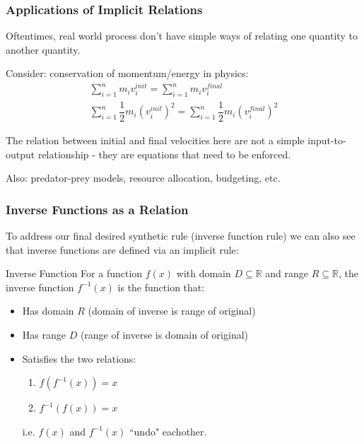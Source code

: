 \documentclass{ltx-talk}
\begin{document}
\begin{frame}
  \frametitle{Applications of Implicit Relations}

  Oftentimes, real world process don't have simple ways of relating one quantity to another quantity. \pause

  Consider: conservation of momentum/energy in physics:
  \begin{gather}
    \sum\limits_{i = 1}^n m_i v^{init}_i = \sum\limits_{i = 1}^n m_i v^{final}_i \\
    \sum\limits_{i = 1}^n \dfrac{1}{2} m_i (v^{init}_i)^2 = \sum\limits_{i = 1}^n \dfrac{1}{2} m_i (v^{final}_i)^2
  \end{gather} \pause

  The relation between initial and final velocities here are not a simple
  input-to-output relationship - \pause they are equations that need to be enforced. \pause

  Also: predator-prey models, resource allocation, budgeting, etc.
\end{frame}

\begin{frame}
  \frametitle{Inverse Functions as a Relation}

  To address our final desired synthetic rule (inverse function rule) \pause
  we can also see that inverse functions are defined via an implicit rule: \pause

  \begin{block}{Inverse Function}
    For a function $f(x)$ with domain $D \subseteq \mathbb{R}$ and range $R \subseteq \mathbb{R}$, the inverse function $f^{-1}(x)$ is the function that: \pause
    \begin{itemize}
      \item Has domain $R$ (domain of inverse is range of original) \pause
      \item Has range $D$ (range of inverse is domain of original) \pause
      \item Satisfies the two relations: 
        \begin{enumerate}
          \item $f(f^{-1}(x)) = x$ 
          \item $f^{-1}(f(x)) = x$
        \end{enumerate} \pause
        i.e. $f(x)$ and $f^{-1}(x)$ ``undo" eachother.
    \end{itemize}
  \end{block}
\end{frame}
\end{document}
